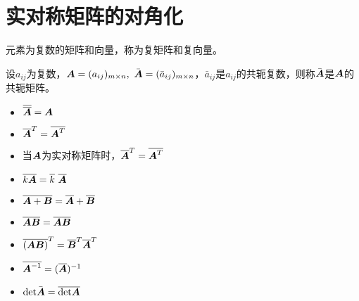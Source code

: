 \section{实对称矩阵的对角化}

\begin{frame}  
    \begin{dingyi}
      元素为复数的矩阵和向量，称为复矩阵和复向量。
    \end{dingyi}

    \begin{dingyi}
      设$a_{ij}$为复数，$\boldsymbol{A}=(a_{ij})_{m\times n},~\bar{\boldsymbol{A}}=(\bar a_{ij})_{m\times n}$，$\bar a_{ij}$是$a_{ij}$的共轭复数，则称$\bar {\boldsymbol{A}}$是$\boldsymbol{A}$的共轭矩阵。
    \end{dingyi}


    \begin{itemize}
    \item $\overline {\overline {\boldsymbol{A}}} = \boldsymbol{A}$
    \item ${\overline {\boldsymbol{A}}}^T = \overline{\boldsymbol{A}^T}$
    \item 当$\boldsymbol{A}$为实对称矩阵时，${\overline {\boldsymbol{A}}}^T = \overline{\boldsymbol{A}^T}$
    \end{itemize}
  
\end{frame}

\begin{frame}
  
    \begin{itemize}
    \item $\overline{k\boldsymbol{A}}=\overline k ~\overline {\boldsymbol{A}}$
    \item $\overline{\boldsymbol{A}+\boldsymbol{B}}=\overline {\boldsymbol{A}}+\overline {\boldsymbol{B}}$
    \item $\overline{\boldsymbol{A}\boldsymbol{B}}=\overline {\boldsymbol{A}}\overline {\boldsymbol{B}}$
    \item $\overline{(\boldsymbol{A}\boldsymbol{B})}^T=\overline {\boldsymbol{B}}^T \overline {\boldsymbol{A}}^T$
    \item $\overline{\boldsymbol{A}^{-1}}=(\overline {\boldsymbol{A}})^{-1}$
    \item $\mathrm{det} \bar{\boldsymbol{A}} = \overline{\mathrm{det} \boldsymbol{A}}$
    \end{itemize}
  
\end{frame}


